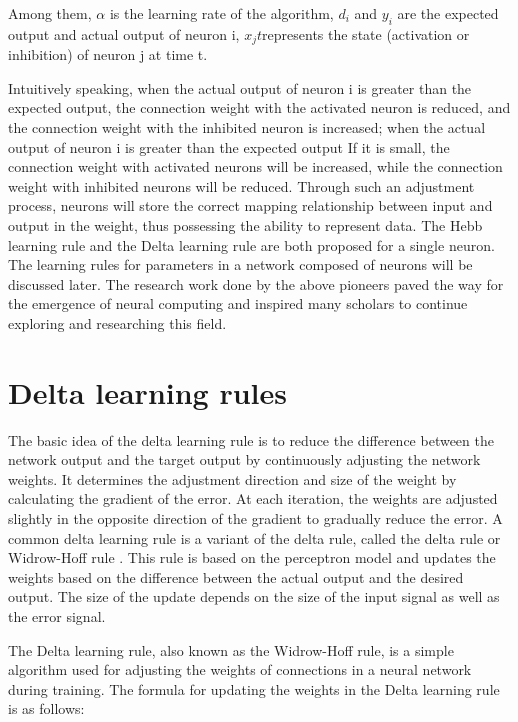\documentclass[12pt,a4paper]{report}
\begin{document}
Among them, $\alpha$ is the learning rate of the algorithm, $d_i$ and $y_i$ are the expected output and actual output of neuron i, $x_j{t}$represents the state (activation or inhibition) of neuron j at time t.

Intuitively speaking, when the actual output of neuron i is greater than the expected output, the connection weight with the activated neuron is reduced, and the connection weight with the inhibited neuron is increased; when the actual output of neuron i is greater than the expected output If it is small, the connection weight with activated neurons will be increased, while the connection weight with inhibited neurons will be reduced. Through such an adjustment process, neurons will store the correct mapping relationship between input and output in the weight, thus possessing the ability to represent data. The Hebb learning rule and the Delta learning rule are both proposed for a single neuron. The learning rules for parameters in a network composed of neurons will be discussed later. The research work done by the above pioneers paved the way for the emergence of neural computing and inspired many scholars to continue exploring and researching this field.


\section{Delta learning rules}

The basic idea of the delta learning rule is to reduce the difference between the network output and the target output by continuously adjusting the network weights. It determines the adjustment direction and size of the weight by calculating the gradient of the error. At each iteration, the weights are adjusted slightly in the opposite direction of the gradient to gradually reduce the error.
A common delta learning rule is a variant of the delta rule, called the delta rule or Widrow-Hoff rule \cite{BernardWidrow1960AdaptiveSwitchingCircuits}. This rule is based on the perceptron model and updates the weights based on the difference between the actual output and the desired output. The size of the update depends on the size of the input signal as well as the error signal.

The Delta learning rule, also known as the Widrow-Hoff rule, is a simple algorithm used for adjusting the weights of connections in a neural network during training. The formula for updating the weights in the Delta learning rule is as follows:
\end{document}
